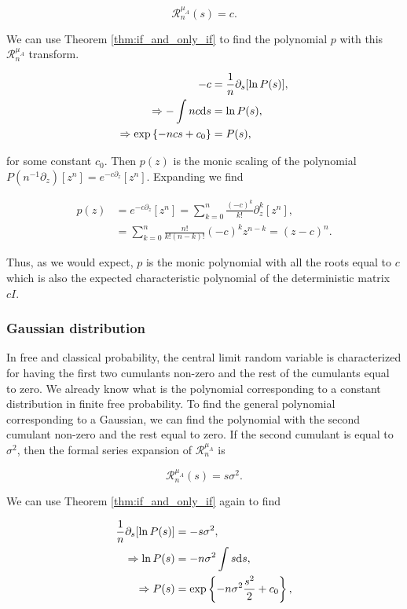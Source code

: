 \begin{equation*}
    \mathcal R_n^{\mu_A}(s) = c.
\end{equation*}

We can use Theorem \ref{thm:if_and_only_if} to find the polynomial $p$ with this $\mathcal R_n^{\mu_A}$ transform.

\begin{align*}
    -c &= \frac{1}{n}\partial_s[\ln P(s)],\\
    \Rightarrow -\int nc\mathrm d s &= \ln P(s),\\
    \Rightarrow \exp\left\{-ncs + c_0\right\} &= P(s),
\end{align*}

\noindent for some constant $c_0$. Then $p(z)$ is the monic scaling of the polynomial $P(n^{-1}\partial_z)[z^n] = e^{-c\partial_z}[z^n]$. Expanding we find

\begin{align*}
    p(z) &= e^{-c\partial_z}[z^n] = \sum_{k=0}^n \frac{(-c)^k}{k!}\partial_z^k[z^n],\\
    &= \sum_{k=0}^n \frac{n!}{k!(n-k)!}(-c)^k z^{n-k} = (z-c)^n.
\end{align*}

Thus, as we would expect, $p$ is the monic polynomial with all the roots equal to $c$ which is also the expected characteristic polynomial of the deterministic matrix $cI$.

\subsubsection{Gaussian distribution}

In free and classical probability, the central limit random variable is characterized for having the first two cumulants non-zero and the rest of the cumulants equal to zero. We already know what is the polynomial corresponding to a constant distribution in finite free probability. To find the general polynomial corresponding to a Gaussian, we can find the polynomial with the second cumulant non-zero and the rest equal to zero. If the second cumulant is equal to $\sigma^2$, then the formal series expansion of $\mathcal R_n^{\mu_A}$ is

\begin{equation*}
    \mathcal R_n^{\mu_A}(s) = s\sigma^2.
\end{equation*}

We can use Theorem \ref{thm:if_and_only_if} again to find

\begin{align*}
    \frac1n \partial_s[ \ln P(s) ] &= -s\sigma^2,\\ 
    \Rightarrow \ln P(s) &= -n\sigma^2 \int s \mathrm d s,\\
    \Rightarrow P(s) &= \exp\left\{ -n \sigma^2\frac {s^2}2 + c_0  \right\},
\end{align*}

